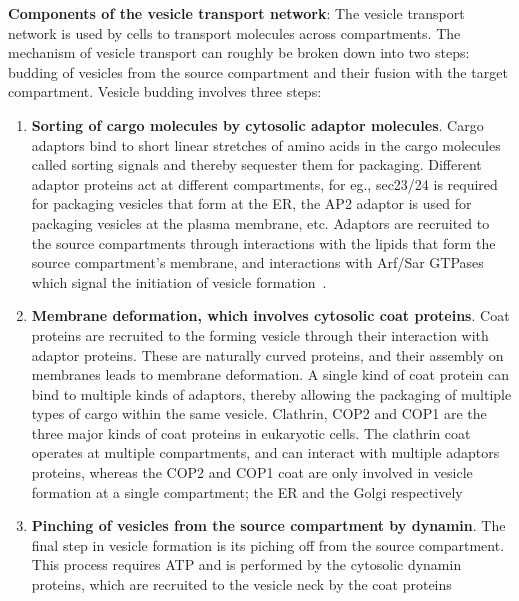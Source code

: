\textbf{Components of the vesicle transport network}:
The vesicle transport network is used by cells to transport molecules across compartments.
% 
The mechanism of vesicle transport can roughly be broken down into two steps: budding of vesicles from the source compartment and their fusion with the target compartment.
%
Vesicle budding involves three steps:
\begin{enumerate}
	\item  \textbf{Sorting of cargo molecules by cytosolic adaptor molecules}. 
	Cargo adaptors bind to short linear stretches of amino acids in the cargo molecules called sorting signals and thereby sequester them for packaging. 
	Different adaptor proteins act at different compartments, for eg., sec23/24 is required
	for packaging vesicles that form at the ER, the AP2 adaptor is used for packaging vesicles at the plasma membrane, etc. 
	Adaptors are recruited to the source compartments through interactions with
	the lipids that form the source compartment's membrane, and interactions with Arf/Sar GTPases which signal the initiation of vesicle formation~\cite{paczkowski2015cargo}.
	
	\item \textbf{Membrane deformation, which involves cytosolic coat proteins}.
	Coat proteins are recruited to the forming vesicle through their interaction with adaptor proteins. 
	These are naturally curved proteins, and their assembly on membranes leads to membrane deformation.
	A single kind of coat protein can bind to multiple kinds of adaptors, thereby allowing the packaging of multiple types of cargo within the same vesicle. 
	Clathrin, COP2 and COP1 are the three major kinds of coat proteins
	in eukaryotic cells. 
	The clathrin coat operates at multiple compartments, and can interact with
	multiple adaptors proteins, whereas the COP2 and COP1 coat are only involved in vesicle formation at a single compartment; the ER and the Golgi respectively~\cite{faini2013vesicle}
	
	
	\item \textbf{Pinching of vesicles from the source compartment by dynamin}.
	The final step in vesicle formation is its piching off from the source compartment.
	This process requires ATP and is performed by the cytosolic dynamin proteins, which are recruited to the vesicle neck by the coat proteins~\cite{cocucci2014dynamin}
\end{enumerate}

